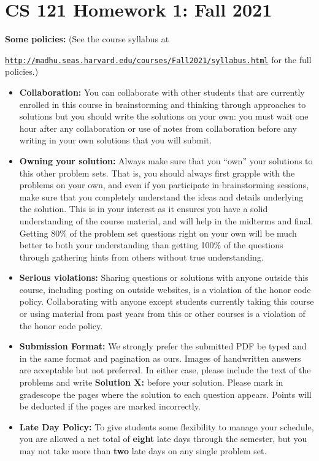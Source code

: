 \documentclass[11pt]{article}
\begin{document}
	\section*{CS 121 Homework 1: Fall
		2021}\label{cs-121-homework-zero-fall-2021}

\textbf{Some policies:} (See the course syllabus at  

{\tt \url{http://madhu.seas.harvard.edu/courses/Fall2021/syllabus.html}} for the
full policies.)

\begin{itemize}
\item
  {\bf Collaboration:} You can collaborate with other students that are currently enrolled in
  this course in brainstorming and thinking through approaches to
  solutions but you should write the solutions on your own: you must wait
  one hour after any collaboration or use of notes from collaboration 
  before any writing in your own solutions that you will submit.
\item
  {\bf Owning your solution:} Always make sure that you ``own'' your solutions to this other problem
  sets. That is, you should always first grapple with the problems on
  your own, and even if you participate in brainstorming sessions, make
  sure that you completely understand the ideas and details underlying
  the solution. This is in your interest as it ensures you have a solid
  understanding of the course material, and will help in the midterms
  and final. Getting 80\% of the problem
  set questions right on your own will be much better to both your
  understanding than getting 100\% of the questions through
  gathering hints from others without true understanding.
\item
  {\bf Serious violations:} Sharing questions or solutions with anyone outside this course,
  including posting on outside websites, is a violation of the honor
  code policy. Collaborating with anyone except students currently
  taking this course or using material from past years from this or
  other courses is a violation of the honor code policy.
\item {\bf Submission Format:} We strongly prefer the submitted PDF be typed and in the same format and pagination as ours. Images of handwritten answers are acceptable but not preferred. In either case, please include the text of the problems and write \textbf{Solution X:} before your solution. Please mark in gradescope the pages where the solution to each question appears. Points will be deducted if the pages are marked incorrectly. 
\item {\bf Late Day Policy:} To give students some flexibility to manage your schedule, you are allowed a net total of {\bf eight} late days through the semester, but you may not take more than {\bf two} late days on any single problem set. 
\end{itemize}
\end{document}
